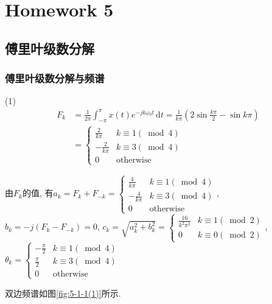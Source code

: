 
\section{Homework 5}

\subsection{傅里叶级数分解}

\subsubsection{傅里叶级数分解与频谱}


(1) 
\begin{align*}
    F_k&=\displaystyle\frac{1}{2\pi}\int_{-\pi}^{\pi}x(t)e^{-jk\omega_0t}\,\mathrm{d}t=\frac{1}{k\pi}(2\sin\frac{k\pi}{2}-\sin{k\pi}) \\
    &= \left\{
        \begin{array}{ll}
            \frac{2}{k\pi} & k\equiv1(\bmod 4) \\
            -\frac{2}{k\pi} & k\equiv3(\bmod 4) \\
            0 & \text{otherwise}
        \end{array}
    \right.
\end{align*}

由$F_k$的值, 有$a_k=F_k+F_{-k}=\left\{\begin{array}{ll}
    \frac{4}{k\pi} & k\equiv1(\bmod 4) \\
    -\frac{4}{k\pi} & k\equiv3(\bmod 4) \\
    0 & \text{otherwise}
\end{array}\right.$, $b_k=-j(F_k-F_{-k})=0$, $c_k=\sqrt{a_k^2+b_k^2}=\left\{\begin{array}{ll}
    \frac{16}{k^2\pi^2} & k \equiv 1 (\bmod 2) \\
    0 & k \equiv 0 (\bmod 2)
\end{array}\right.$, $\theta_k=\left\{\begin{array}{ll}
    -\frac{\pi}{2} & k \equiv 1 (\bmod 4) \\
    \frac{\pi}{2} & k \equiv 3 (\bmod 4) \\
    0 & \text{otherwise}
\end{array}\right.$

双边频谱如图\ref{fig:5-1-1(1)}所示.

